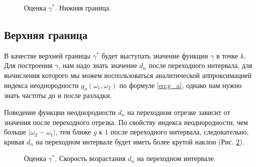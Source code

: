 \documentclass[specialist, substylefile = spbu.rtx,
			   subf, href, 12pt]{disser}
\begin{document}
\begin{figure}[!hhh]
	\caption{Оценка $ \gamma^* $. Нижняя граница.}
	\label{pic:estimate_gamma_lower}
\end{figure}

\subsection{Верхняя граница}\label{ch:apper_border}
В качестве верхней границы $ \gamma^* $ будет выступать значение функции $ \gamma $ в точке $ k $. Для построения $ \gamma $, нам надо знать значение $ d_n $ после переходного интервала, для вычисления которого мы можем воспользоваться аналитической аппроксимацией индекса неоднородности $ g_a(\omega_1, \omega_2) $ по формуле \eqref{eq:g_a}, однако нам нужно знать частоты до и после разладки.

Поведение функции неоднородности $ d_n $ на переходном отрезке зависит от значения после переходного отрезка. По свойству индекса неоднородности, чем больше $ |\omega_2 - \omega_1| $, тем ближе $ g $ к $ 1 $ после переходного интервала, следовательно, кривая $ d_n $ на переходном интервале будет иметь более крутой наклон (Рис. \ref{pic:diff_omega_growth}).

\begin{figure}[!hhh]
	\caption{Оценка $ \gamma^* $. Скорость возрастания $ d_n $ на переходном интервале.}
	\label{pic:diff_omega_growth}
\end{figure}
\end{document}
